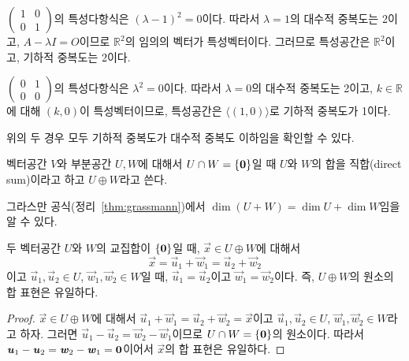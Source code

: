\documentclass[sections/engineering_mathematics_lecture_note.tex]{subfiles}
\begin{document}
\begin{example}
    $\begin{pmatrix}1 & 0\\0 & 1\end{pmatrix}$의 특성다항식은 $(\lambda - 1)^2 = 0$이다.
    따라서 $\lambda = 1$의 대수적 중복도는 2이고, $A - \lambda I = O$이므로 $\mathbb R^2$의 임의의 벡터가 특성벡터이다.
    그러므로 특성공간은 $\mathbb R^2$이고, 기하적 중복도는 2이다.

    $\begin{pmatrix}0 & 1\\0 & 0\end{pmatrix}$의 특성다항식은 $\lambda^2 = 0$이다.
    따라서 $\lambda = 0$의 대수적 중복도는 2이고, $k \in \mathbb R$에 대해 $(k, 0)$이 특성벡터이므로, 특성공간은 $\langle (1, 0) \rangle$로 기하적 중복도가 1이다.

    위의 두 경우 모두 기하적 중복도가 대수적 중복도 이하임을 확인할 수 있다.
\end{example}

\begin{definition}
    벡터공간 $V$와 부분공간 $U, W$에 대해서 $U \cap W = \{\bm{\mathrm{0}}\}$일 때 $U$와 $W$의 합을 직합(direct sum)이라고 하고 $U \oplus W$라고 쓴다.
\end{definition}

\begin{remark}
    그라스만 공식(정리~\ref{thm:grassmann})에서 $\dim (U + W) = \dim U + \dim W$임을 알 수 있다.
\end{remark}

\begin{theorem}
    두 벡터공간 $U$와 $W$의 교집합이 $\{\bm{\mathrm{0}}\}$일 때, $\vec x \in U \oplus W$에 대해서
    \begin{equation*}
        \vec x = \vec u_1 + \vec w_1 = \vec u_2 + \vec w_2
    \end{equation*}
    이고 $\vec u_1, \vec u_2 \in U$, $\vec w_1, \vec w_2 \in W$일 때, $\vec u_1 = \vec u_2$이고 $\vec w_1 = \vec w_2$이다.
    즉, $U \oplus W$의 원소의 합 표현은 유일하다.
\end{theorem}

\begin{proof}
    $\vec x \in U \oplus W$에 대해서 $\vec u_1 + \vec w_1 = \vec u_2 + \vec w_2 = \vec x$이고 $\vec u_1, \vec u_2 \in U$, $\vec w_1, \vec w_2 \in W$라고 하자.
    그러면 $\vec u_1 - \vec u_2 = \vec w_2 - \vec w_1$이므로 $U \cap W = \{\bm{\mathrm{0}}\}$의 원소이다.
    따라서 $\bm{\mathit{u}}_1 - \bm{\mathit{u}}_2 = \bm{\mathit{w}}_2 - \bm{\mathit{w}}_1 = \bm{\mathrm{0}}$이어서 $\vec x$의 합 표현은 유일하다.
\end{proof}
\end{document}
